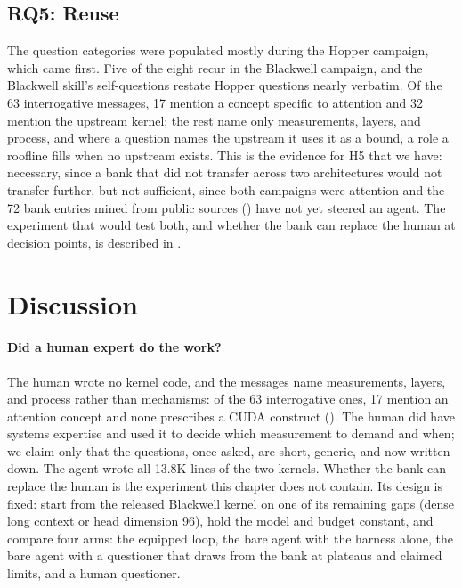 \subsection{RQ5: Reuse}
\label{kernelseek:sec:eval-auto}

The question categories were populated mostly during the Hopper campaign, which came first. Five of
the eight recur in the Blackwell campaign, and the Blackwell skill's self-questions restate Hopper
questions nearly verbatim. Of the 63 interrogative messages, 17 mention a concept specific to
attention and 32 mention the upstream kernel; the rest name only measurements, layers, and process,
and where a question names the upstream it uses it as a bound, a role a roofline fills when no
upstream exists. This is the evidence for H5 that we have: necessary, since a bank that did not
transfer across two architectures would not transfer further, but not sufficient, since both
campaigns were attention and the 72 bank entries mined from public sources ()
have not yet steered an agent. The experiment that would test both, and whether the bank can replace
the human at decision points, is described in .

\section{Discussion}
\label{kernelseek:sec:discussion}

\paragraph{Did a human expert do the work?} The human wrote no kernel code, and the messages name
measurements, layers, and process rather than mechanisms: of the 63 interrogative ones, 17 mention an
attention concept and none prescribes a CUDA construct (). The human did have systems
expertise and used it to decide which measurement to demand and when; we claim only that the
questions, once asked, are short, generic, and now written down. The agent wrote all 13.8K lines of
the two kernels.
Whether the bank can replace the human is the experiment this chapter does not contain. Its design is
fixed: start from the released Blackwell kernel on one of its remaining gaps (dense long context or
head dimension 96), hold the model and budget constant, and compare four arms: the equipped loop,
the bare agent with the harness alone, the bare agent with a questioner that draws from the bank at
plateaus and claimed limits, and a human questioner.

